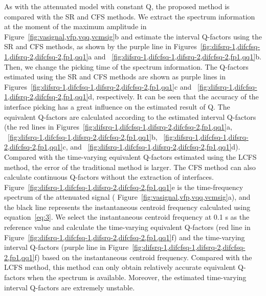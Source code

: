 As with the attenuated model with constant Q, the proposed method is compared
with the SR and CFS methods. We extract the spectrum information at the
moment of the maximum amplitude in Figure~\ref{fig:vasignal,vfp,vqq,vcmsig}b
and estimate the interval Q-factors using the SR and CFS methods, as shown by
the purple line in
Figures~\ref{fig:difsrq-1,difcfsq-1,difsrq-2,difcfsq-2,fp1,qq1}a
and ~\ref{fig:difsrq-1,difcfsq-1,difsrq-2,difcfsq-2,fp1,qq1}b. Then, we
change the picking time of the spectrum information. The Q-factors estimated
using the SR and CFS methods are shown as purple lines in
Figures~\ref{fig:difsrq-1,difcfsq-1,difsrq-2,difcfsq-2,fp1,qq1}c and
~\ref{fig:difsrq-1,difcfsq-1,difsrq-2,difcfsq-2,fp1,qq1}d, respectively. It
can be seen that the accuracy of the interface picking has a great influence
on the estimated result of Q. The equivalent Q-factors are calculated
according to the estimated interval Q-factors (the red lines in
Figures~\ref{fig:difsrq-1,difcfsq-1,difsrq-2,difcfsq-2,fp1,qq1}a,
~\ref{fig:difsrq-1,difcfsq-1,difsrq-2,difcfsq-2,fp1,qq1}b,
~\ref{fig:difsrq-1,difcfsq-1,difsrq-2,difcfsq-2,fp1,qq1}c, and
~\ref{fig:difsrq-1,difcfsq-1,difsrq-2,difcfsq-2,fp1,qq1}d). Compared with the
time-varying equivalent Q-factors estimated using the LCFS method, the error
of the traditional method is larger. The CFS method can also calculate
continuous Q-factors without the extraction of interfaces.
Figure~\ref{fig:difsrq-1,difcfsq-1,difsrq-2,difcfsq-2,fp1,qq1}e is the
time-frequency spectrum of the attenuated signal (
Figure~\ref{fig:vasignal,vfp,vqq,vcmsig}a), and the black line represents the
instantaneous centroid frequency calculated using equation~\ref{eq:3}. We
select the instantaneous centroid frequency at 0.1 s as the reference value
and calculate the time-varying equivalent Q-factors (red line in
Figure~\ref{fig:difsrq-1,difcfsq-1,difsrq-2,difcfsq-2,fp1,qq1}f) and the
time-varying interval Q-factors (purple line in
Figure~\ref{fig:difsrq-1,difcfsq-1,difsrq-2,difcfsq-2,fp1,qq1}f) based on the
instantaneous centroid frequency. Compared with the LCFS method, this method
can only obtain relatively accurate equivalent Q-factors when the spectrum is
available. Moreover, the estimated time-varying interval Q-factors are 
extremely unstable.            
          
